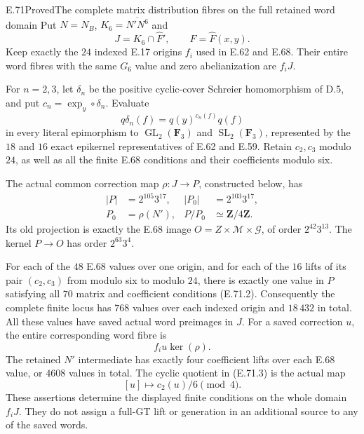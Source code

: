 \begin{statement}{E.71}{Proved}{The complete matrix distribution fibres on the full retained word domain}
Put $N=N_B$, $K_6=\overline{N'N^6}$ and
\[
             J=K_6\cap\widehat F',\qquad
             \widehat F=\widehat F(x,y).
 \tag{E.71.1}
\]
Keep exactly the $24$ indexed E.17 origins $f_i$ used
in E.62 and E.68. Their entire word fibres with the
same $G_6$ value and zero abelianization are $f_iJ$.

For $n=2,3$, let $\delta_n$ be the positive cyclic-cover
Schreier homomorphism of D.5, and put
$c_n=\operatorname{exp}_y\circ\delta_n$.
Evaluate
\[
       q\delta_n(f)=q(y)^{c_n(f)}q(f)
 \tag{E.71.2}
\]
in every literal epimorphism to
$\operatorname{GL}_2(\mathbf F_3)$ and
$\operatorname{SL}_2(\mathbf F_3)$, represented by the
$18$ and $16$ exact epikernel representatives of
E.62 and E.59. Retain $c_2,c_3$ modulo $24$, as well as
all the finite E.68 conditions and their coefficients
modulo six.

The actual common correction map $\rho:J\to P$,
constructed below, has
\[
 \begin{aligned}
 |P|&=2^{105}3^{17},&
 |P_0|&=2^{103}3^{17},\\
 P_0&=\rho(N'),&
 P/P_0&\simeq\mathbf Z/4\mathbf Z.
 \end{aligned}
 \tag{E.71.3}
\]
Its old projection is exactly the E.68 image
$O=Z\times\mathcal M\times\mathcal G$, of order
$2^{42}3^{13}$. The kernel $P\to O$ has order
$2^{63}3^4$.

For each of the $48$ E.68 values over one origin,
and for each of the $16$ lifts of its pair
$(c_2,c_3)$ from modulo six to modulo $24$, there is
exactly one value in $P$ satisfying all $70$ matrix
and coefficient conditions (E.71.2). Consequently
the complete finite locus has $768$ values over each
indexed origin and $18\,432$ in total. All these
values have saved actual word preimages in $J$.
For a saved correction $u$, the entire corresponding
word fibre is
\[
                         f_i u\ker(\rho).
 \tag{E.71.4}
\]
The retained $N'$ intermediate has exactly four
coefficient lifts over each E.68 value, or $4608$
values in total. The cyclic quotient in (E.71.3)
is the actual map
\[
            [u]\longmapsto c_2(u)/6\pmod4.
 \tag{E.71.5}
\]
These assertions determine the displayed finite
conditions on the whole domain $f_iJ$. They do not
assign a full-GT lift or generation in an additional
source to any of the saved words.
\end{statement}
